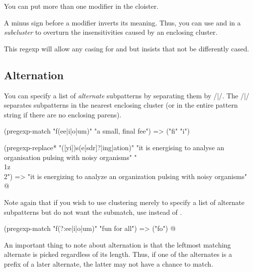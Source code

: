 {

You can put more than one modifier in the cloister.


A minus sign before a modifier inverts its meaning.
Thus, you can use  and  in a {\em
subcluster} to overturn the insensitivities caused by an
enclosing cluster.


\n This regexp will allow any casing for 
and  but insists that  not be 
differently cased.

\subsection{Alternation}
\label{alternation}

You can specify a list of {\em alternate}
subpatterns by separating them by \p/|/.   The \p/|/
separates subpatterns in the nearest enclosing cluster 
(or in the entire pattern string if there are no
enclosing parens).  

\q@
(pregexp-match "f(ee|i|o|um)" "a small, final fee")
=> ("fi" "i")

(pregexp-replace* "([yi])s(e[sdr]?|ing|ation)"
   "it is energising to analyse an organisation 
   pulsing with noisy organisms"
   "\\1z\\2")
=> "it is energizing to analyze an organization 
   pulsing with noisy organisms"
@
 
Note again that if you wish
to use clustering merely to specify a list of alternate
subpatterns but do not want the submatch, use 
instead of \p{(}. 

\q@
(pregexp-match "f(?:ee|i|o|um)" "fun for all")
=> ("fo")
@

An important thing to note about alternation is that
the leftmost matching alternate is picked regardless of
its length.  Thus, if one of the alternates is a prefix
of a later alternate, the latter may not have 
a chance to match.

}
